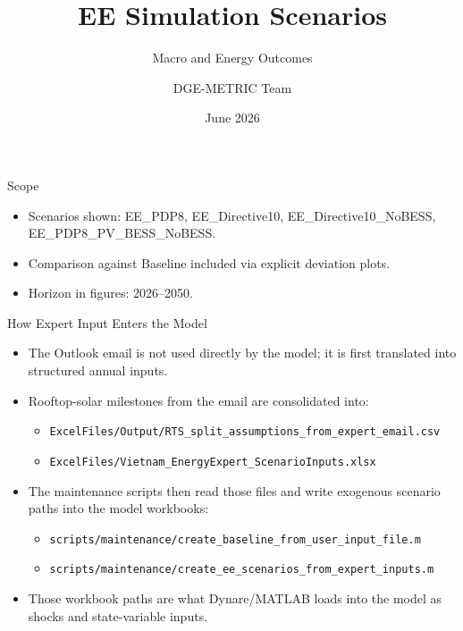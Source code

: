 \documentclass[aspectratio=169]{beamer}
\title{EE Simulation Scenarios}
\subtitle{Macro and Energy Outcomes}
\author{DGE-METRIC Team}
\date{June 2026}
\begin{document}
\begin{frame}
  \titlepage
\end{frame}

\begin{frame}{Scope}
\begin{itemize}
  \item Scenarios shown: EE\_PDP8, EE\_Directive10, EE\_Directive10\_NoBESS, EE\_PDP8\_PV\_BESS\_NoBESS.
  \item Comparison against Baseline included via explicit deviation plots.
  \item Horizon in figures: 2026--2050.
\end{itemize}
\end{frame}

\begin{frame}{How Expert Input Enters the Model}
\small
\begin{itemize}
  \item The Outlook email is not used directly by the model; it is first translated into structured annual inputs.
  \item Rooftop-solar milestones from the email are consolidated into:
  \begin{itemize}
    \item \texttt{ExcelFiles/Output/RTS\_split\_assumptions\_from\_expert\_email.csv}
    \item \texttt{ExcelFiles/Vietnam\_EnergyExpert\_ScenarioInputs.xlsx}
  \end{itemize}
  \item The maintenance scripts then read those files and write exogenous scenario paths into the model workbooks:
  \begin{itemize}
    \item \texttt{scripts/maintenance/create_baseline_from_user_input_file.m}
    \item \texttt{scripts/maintenance/create_ee_scenarios_from_expert_inputs.m}
  \end{itemize}
  \item Those workbook paths are what Dynare/MATLAB loads into the model as shocks and state-variable inputs.
\end{itemize}
\end{frame}
\end{document}
